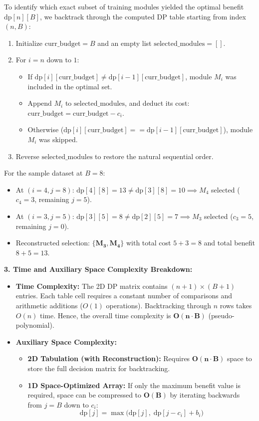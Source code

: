 \documentclass[12pt]{article}
\begin{document}
To identify which exact subset of training modules yielded the optimal benefit $\text{dp}[n][B]$, we backtrack through the computed DP table starting from index $(n, B)$:
\begin{enumerate}
    \item Initialize $\text{curr\_budget} = B$ and an empty list $\text{selected\_modules} = []$.
    \item For $i = n$ down to $1$:
    \begin{itemize}
        \item If $\text{dp}[i][\text{curr\_budget}] \neq \text{dp}[i-1][\text{curr\_budget}]$, module $M_i$ was included in the optimal set.
        \item Append $M_i$ to $\text{selected\_modules}$, and deduct its cost: $\text{curr\_budget} = \text{curr\_budget} - c_i$.
        \item Otherwise ($\text{dp}[i][\text{curr\_budget}] == \text{dp}[i-1][\text{curr\_budget}]$), module $M_i$ was skipped.
    \end{itemize}
    \item Reverse $\text{selected\_modules}$ to restore the natural sequential order.
\end{enumerate}
For the sample dataset at $B=8$:
\begin{itemize}
    \item At $(i=4, j=8)$: $\text{dp}[4][8]=13 \neq \text{dp}[3][8]=10 \implies M_4$ selected ($c_4=3$, remaining $j=5$).
    \item At $(i=3, j=5)$: $\text{dp}[3][5]=8 \neq \text{dp}[2][5]=7 \implies M_3$ selected ($c_3=5$, remaining $j=0$).
    \item Reconstructed selection: $\mathbf{\{M_3, M_4\}}$ with total cost $5+3=8$ and total benefit $8+5=13$.
\end{itemize}

\textbf{3. Time and Auxiliary Space Complexity Breakdown:}

\begin{itemize}
    \item \textbf{Time Complexity:} The 2D DP matrix contains $(n+1) \times (B+1)$ entries. Each table cell requires a constant number of comparisons and arithmetic additions ($O(1)$ operations). Backtracking through $n$ rows takes $O(n)$ time. Hence, the overall time complexity is $\mathbf{O(n \cdot B)}$ (pseudo-polynomial).
    \item \textbf{Auxiliary Space Complexity:}
    \begin{itemize}
        \item \textbf{2D Tabulation (with Reconstruction):} Requires $\mathbf{O(n \cdot B)}$ space to store the full decision matrix for backtracking.
        \item \textbf{1D Space-Optimized Array:} If only the maximum benefit value is required, space can be compressed to $\mathbf{O(B)}$ by iterating backwards from $j = B$ down to $c_i$:
        \[
        \text{dp}[j] = \max\big(\text{dp}[j], \; \text{dp}[j - c_i] + b_i\big)
        \]
    \end{itemize}
\end{itemize}
\end{document}
